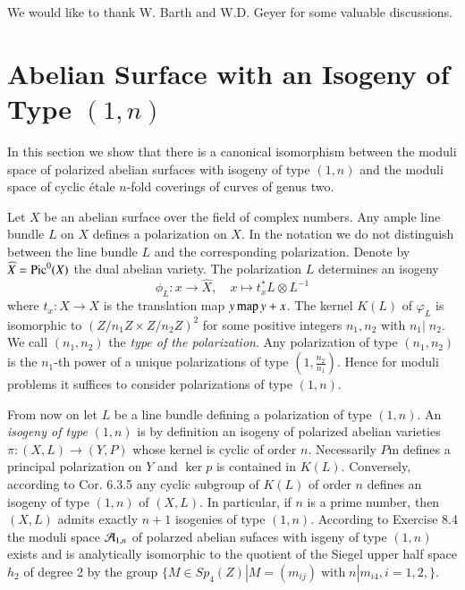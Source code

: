 We would like to thank W. Barth and W.D. Geyer for some valuable discussions.

\section{Abelian Surface with an Isogeny of Type \protect\boldmath$(1,n)$}\label{chap11-sec-1}
\pageoriginale

In this section we show that there is a canonical isomorphism between the moduli space of polarized abelian surfaces with isogeny of type $(1,n)$ and the moduli space of cyclic \'etale $n$-fold coverings of curves of genus two.

Let $X$ be an abelian surface over the field of complex numbers. Any ample line bundle $L$ on $X$ defines a polarization on $X$. In the notation we do not distinguish between the line bundle $L$ and the corresponding polarization. Denote by $\widehat{X} = \operatorname{Pic}^{0}(X)$ the dual abelian variety. The polarization $L$ determines an isogeny
$$
\phi_{L}:x \rightarrow \widehat{X}, \quad x \mapsto t_{x}^{*}L \otimes L^{-1}
$$
where $t_{x}:X \rightarrow X$ is the translation map $y \operatorname{map} y +x$. The kernel $K(L)$ of $\varphi_{L}$ is isomorphic to $ (Z/n_{1} Z \times Z/n_{2}Z)^{2}$ for some positive integers $n_{1},n_{2}$ with $n_{1} |\; n_{2}$. We call $(n_{1}, n_{2})$ the \textit{type of the polarization}. Any polarization of type $(n_{1}, n_{2})$ is the $n_{1}$-th power of a unique polarizations of type $(1, \frac{n_{2}}{n_{1}})$. Hence for moduli problems it suffices to consider polarizations of type $(1,n)$.  

From now on let $L$ be a line bundle defining a polarization of type $(1,n)$. An \textit{isogeny of type} $(1,n)$ is by definition an isogeny of polarized abelian varieties $\pi : (X, L) \rightarrow (Y, P)$ whose kernel is cyclic of order $n$. Necessarily $P$m defines a principal polarization on $Y$ and $\ker p$ is contained in $K(L)$. Conversely, according to \cite{chap11-keyL-B} Cor. 6.3.5 any cyclic subgroup of $K(L)$ of order $n$ defines an isogeny of type $(1,n)$ of $(X,L)$. In particular, if $n$ is a prime number, then $(X, L)$ admits exactly $n+1$ isogenies of type $(1,n)$. According to
\cite{chap11-keyL-B} Exercise 8.4 the moduli space $\mathcal{A}_{1,n}$  of polarzed abelian sufaces with isgeny of type $(1,n)$ exists and is analytically isomorphic to the quotient of the Siegel upper half space $h_{2}$ of degree 2 by the group $\{ M \in Sp_{4}(Z) | M=(m_{ij})\; \text{with} \; n|m_{i4}, i=1,2,\}$.

